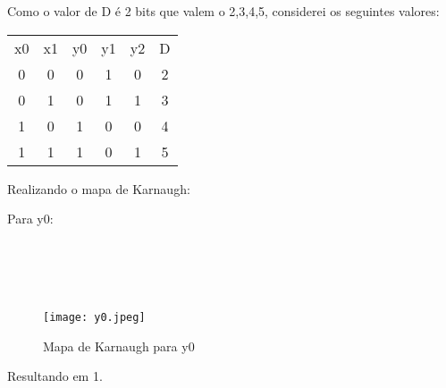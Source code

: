\documentclass{article}
\begin{document}
Como o valor de D é 2 bits que valem o {2,3,4,5}, considerei os seguintes valores:

\begin{table}[h]
 \centering
 {\renewcommand\arraystretch{1.25}
 \begin{tabular}{ l l l l l l }
  \cline{1-1}\cline{2-2}\cline{3-3}\cline{4-4}\cline{5-5}\cline{6-6}
    \multicolumn{1}{|c|}{x0} &
    \multicolumn{1}{c|}{x1} &
    \multicolumn{1}{c|}{y0} &
    \multicolumn{1}{c|}{y1} &
    \multicolumn{1}{c|}{y2} &
    \multicolumn{1}{c|}{D}
  \\
  \cline{1-1}\cline{2-2}\cline{3-3}\cline{4-4}\cline{5-5}\cline{6-6}
    \multicolumn{1}{|c|}{0} &
    \multicolumn{1}{c|}{0} &
    \multicolumn{1}{c|}{0} &
    \multicolumn{1}{c|}{1} &
    \multicolumn{1}{c|}{0} &
    \multicolumn{1}{c|}{2}
  \\
  \cline{1-1}\cline{2-2}\cline{3-3}\cline{4-4}\cline{5-5}\cline{6-6}
    \multicolumn{1}{|c|}{0} &
    \multicolumn{1}{c|}{1} &
    \multicolumn{1}{c|}{0} &
    \multicolumn{1}{c|}{1} &
    \multicolumn{1}{c|}{1} &
    \multicolumn{1}{c|}{3}
  \\
  \cline{1-1}\cline{2-2}\cline{3-3}\cline{4-4}\cline{5-5}\cline{6-6}
    \multicolumn{1}{|c|}{1} &
    \multicolumn{1}{c|}{0} &
    \multicolumn{1}{c|}{1} &
    \multicolumn{1}{c|}{0} &
    \multicolumn{1}{c|}{0} &
    \multicolumn{1}{c|}{4}
  \\
  \cline{1-1}\cline{2-2}\cline{3-3}\cline{4-4}\cline{5-5}\cline{6-6}
    \multicolumn{1}{|c|}{1} &
    \multicolumn{1}{c|}{1} &
    \multicolumn{1}{c|}{1} &
    \multicolumn{1}{c|}{0} &
    \multicolumn{1}{c|}{1} &
    \multicolumn{1}{c|}{5}
  \\
  \hline

 \end{tabular} }
\end{table}

Realizando o mapa de Karnaugh:

Para y0:
\\
\\
\\
\\
\\
\begin{figure}[!h]
\centering
\texttt{[image: y0.jpeg]}
\caption{Mapa de Karnaugh para y0}
\label{fig:CL_logo}
\end{figure}

Resultando em 1.
\end{document}
